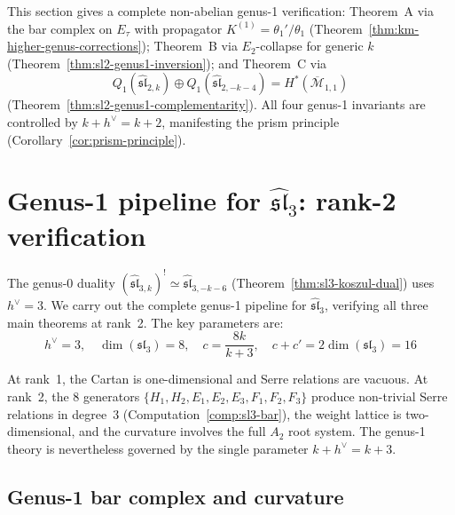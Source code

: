 \begin{remark}
\label{rem:sl2-three-theorems}
This section gives a complete non-abelian genus-1 verification: Theorem~A via the bar complex on $E_\tau$ with propagator $K^{(1)} = \theta_1'/\theta_1$ (Theorem~\ref{thm:km-higher-genus-corrections}); Theorem~B via $E_2$-collapse for generic $k$ (Theorem~\ref{thm:sl2-genus1-inversion}); and Theorem~C via
\[
Q_1(\widehat{\mathfrak{sl}}_{2,k}) \oplus Q_1(\widehat{\mathfrak{sl}}_{2,-k-4}) = H^*(\overline{\mathcal{M}}_{1,1})
\]
(Theorem~\ref{thm:sl2-genus1-complementarity}).  All four genus-1 invariants are controlled by $k + h^\vee = k + 2$, manifesting the prism principle (Corollary~\ref{cor:prism-principle}).
\end{remark}

\section{\texorpdfstring{Genus-1 pipeline for $\widehat{\mathfrak{sl}}_3$: rank-2 verification}{Genus-1 pipeline for sl-3: rank-2 verification}}
\label{sec:sl3-genus-one-pipeline}

The genus-0 duality $(\widehat{\mathfrak{sl}}_{3,k})^! \simeq \widehat{\mathfrak{sl}}_{3,-k-6}$ (Theorem~\ref{thm:sl3-koszul-dual}) uses $h^\vee = 3$.  We carry out the complete genus-1 pipeline for $\widehat{\mathfrak{sl}}_3$, verifying all three main theorems at rank~2.  The key parameters are:
\begin{equation}\label{eq:sl3-parameters}
h^\vee = 3, \quad \dim(\mathfrak{sl}_3) = 8, \quad c = \frac{8k}{k+3}, \quad c + c' = 2\dim(\mathfrak{sl}_3) = 16
\end{equation}

At rank~1, the Cartan is one-dimensional and Serre relations are vacuous.  At rank~2, the 8 generators $\{H_1, H_2, E_1, E_2, E_3, F_1, F_2, F_3\}$ produce non-trivial Serre relations in degree~3 (Computation~\ref{comp:sl3-bar}), the weight lattice is two-dimensional, and the curvature involves the full $A_2$ root system.  The genus-1 theory is nevertheless governed by the single parameter $k + h^\vee = k + 3$.

\subsection{Genus-1 bar complex and curvature}

